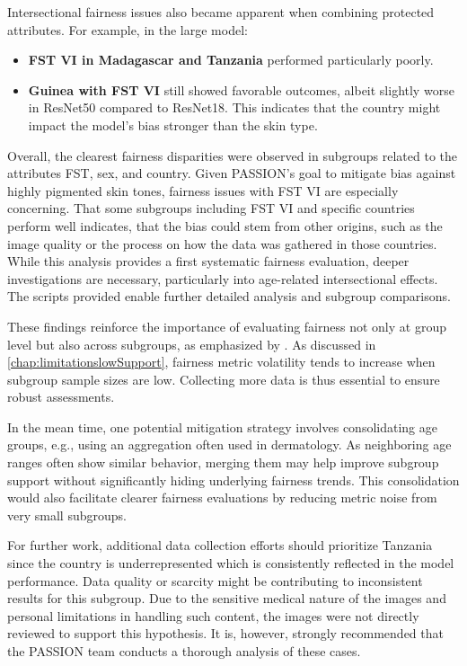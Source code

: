 \documentclass[12pt, a4paper, oneside]{book}   	%
\begin{document}
		Intersectional fairness issues also became apparent when combining protected attributes. For example, in the large model:
		\begin{itemize}
			\item \textbf{\gls{FST} VI in Madagascar and Tanzania} performed particularly poorly.
			\item \textbf{Guinea with \gls{FST} VI} still showed favorable outcomes, albeit slightly worse in ResNet50 compared to ResNet18. This indicates that the country might impact the model's bias stronger than the skin type.
		\end{itemize}
		
		Overall, the clearest fairness disparities were observed in subgroups related to the attributes \gls{FST}, sex, and country. Given PASSION’s goal to mitigate bias against highly pigmented skin tones, fairness issues with \gls{FST} VI are especially concerning. That some subgroups including \gls{FST} VI and specific countries perform well indicates, that the bias could stem from other origins, such as the image quality or the process on how the data was gathered in those countries. While this analysis provides a first systematic fairness evaluation, deeper investigations are necessary, particularly into age-related intersectional effects. The scripts provided enable further detailed analysis and subgroup comparisons.
		
		
		
		These findings reinforce the importance of evaluating fairness not only at group level but also across subgroups, as emphasized by \textcite{M79_Kearns_2018, M80_Kearns_2019}. As discussed in \autoref{chap:limitationslowSupport}, fairness metric volatility tends to increase when subgroup sample sizes are low. Collecting more data is thus essential to ensure robust assessments.
		 
		In the mean time, one potential mitigation strategy involves consolidating age groups, e.g., using an aggregation often used in dermatology. As neighboring age ranges often show similar behavior, merging them may help improve subgroup support without significantly hiding underlying fairness trends. This consolidation would also facilitate clearer fairness evaluations by reducing metric noise from very small subgroups.
		
		For further work, additional data collection efforts should prioritize Tanzania since the country is underrepresented which is consistently reflected in the model performance. Data quality or scarcity might be contributing to inconsistent results for this subgroup. Due to the sensitive medical nature of the images and personal limitations in handling such content, the images were not directly reviewed to support this hypothesis. It is, however, strongly recommended that the PASSION team conducts a thorough analysis of these cases.
		
\end{document}
